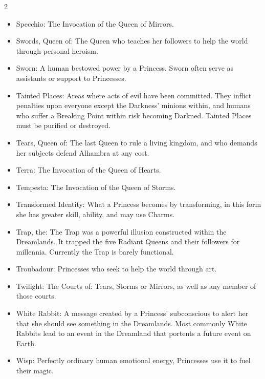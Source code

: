 \begin{multicols}{2}
\begin{itemize}
  \item Specchio: The Invocation of the Queen of Mirrors.
  \item Swords, Queen of: The Queen who teaches her followers to help the world through personal heroism.
  \item Sworn: A human bestowed power by a Princess. Sworn often serve as assistants or support to Princesses. 
  \item Tainted Places: Areas where acts of evil have been committed. They inflict penalties upon everyone except the Darkness' minions within, and humans who suffer a Breaking Point within risk becoming Darkned. Tainted Places must be purified or destroyed. 
  \item Tears, Queen of: The last Queen to rule a living kingdom, and who demands her subjects defend Alhambra at any cost. 
  \item Terra: The Invocation of the Queen of Hearts.
  \item Tempesta: The Invocation of the Queen of Storms.
  \item Transformed Identity: What a Princess becomes by transforming, in this form she has greater skill, ability, and may use Charms. 
  \item Trap, the: The Trap was a powerful illusion constructed within the Dreamlands. It trapped the five Radiant Queens and their followers for millennia. Currently the Trap is barely functional.
  \item Troubadour: Princesses who seek to help the world through art. 
  \item Twilight: The Courts of: Tears, Storms or Mirrors, as well as any member of those courts.
  \item White Rabbit: A message created by a Princess' subconscious to alert her that she should see something in the Dreamlands. Most commonly White Rabbits lead to an event in the Dreamland that portents a future event on Earth. 
  \item Wisp: Perfectly ordinary human emotional energy, Princesses use it to fuel their magic. 
\end{itemize}

\end{multicols}
